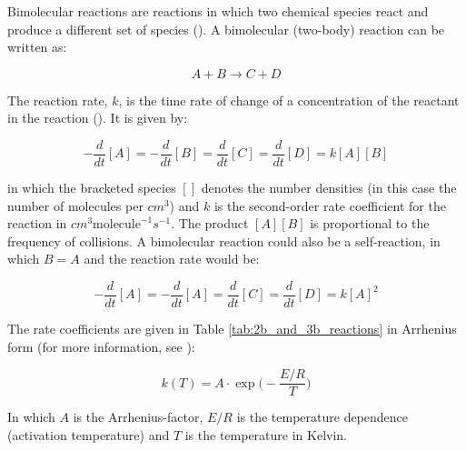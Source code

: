Bimolecular reactions are reactions in which two chemical species react and produce a different set of species (\cite{Jacob1999}). A bimolecular (two-body) reaction can be written as: 

\begin{equation*}
    A + B \rightarrow C + D
\end{equation*}





The reaction rate, $k$, is the time rate of change of a concentration of the reactant in the reaction (\cite{AtmModFund}). It is given by: 

\begin{equation*}
    -\frac{d}{dt}[A] = -\frac{d}{dt}[B] = \frac{d}{dt}[C] = \frac{d}{dt}[D] = k[A][B]
\end{equation*}

in which the bracketed species $[]$ denotes the number densities (in this case the number of molecules per $cm^3$) and $k$ is the second-order rate coefficient for the reaction in $cm^3\text{molecule}^{-1}s^{-1}$. The product $[A][B]$ is proportional to the frequency of collisions. A bimolecular reaction could also be a self-reaction, in which $B = A$ and the reaction rate would be:

\begin{equation*}
    -\frac{d}{dt}[A] = -\frac{d}{dt}[A] = \frac{d}{dt}[C] = \frac{d}{dt}[D] = k[A]^2
\end{equation*}

The rate coefficients are given in Table \ref{tab:2b_and_3b_reactions} in Arrhenius form (for more information, see \cite{JPL}):

\begin{equation}
    k(T) = A\cdot\exp{\Big(-\frac{E/R}{T}\Big)}
    \label{eq:2b_rate_coeff}
\end{equation}

In which $A$ is the Arrhenius-factor, $E/R$ is the temperature dependence (activation temperature) and $T$ is the temperature in Kelvin. 


